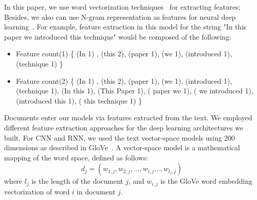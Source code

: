 \documentclass[sigconf, final]{acmart}
\begin{document}
In this paper, we use word vectorization techniques~\cite{hotta2010word} for extracting features; Besides, we also can use N-gram representation as features for neural deep learning~\cite{kevselj2003n,dave2003mining}. For example, feature extraction in this model for the string "In this paper we introduced this technique" would be composed of the following:
\begin{itemize}
\item Feature count(1) \{ (In 1) , (this 2), (paper 1), (we 1), (introduced 1), (technique 1) \}

\item Feature count(2) \{ (In 1) , (this 2), (paper 1), (we 1), (introduced 1), (technique 1), (In this 1), (This Paper 1), ( paper we 1), ( we introduced 1), (introduced this 1), ( this technique 1) \}

\end{itemize}
Documents enter our models via features extracted from the text. We employed different feature extraction approaches for the deep learning architectures we built. For CNN and RNN, we used the text vector-space models using $200$ dimensions as described in GloVe~\cite{pennington2014glove}. A vector-space model is a mathematical mapping of the word space, defined as follows:
\begin{equation}
    d_j = (w_{1,j},w_{2,j},...,w_{i,j}...,w_{l_j,j})
\end{equation}
where $l_j$ is the length of the document $j$, and $w_{i,j}$ is the GloVe word embedding vectorization of word $i$ in document $j$.
\end{document}

